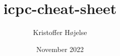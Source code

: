 \documentclass[8pt,a4paper,landscape,oneside]{amsart}
\title{icpc-cheat-sheet}
\author{Kristoffer Højelse}
\date{November 2022}
\newcommand{\code}[1]{\inputminted[fontsize=\normalsize,baselinestretch=1]{python}{code/#1}}
\begin{document}
\begin{multicols*}{3}

\code{helloworld.py}

\end{multicols*}
\end{document}
